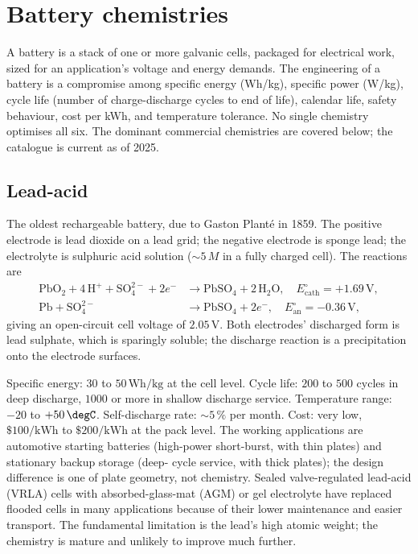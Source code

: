 \section{Battery chemistries}

A battery is a stack of one or more galvanic cells, packaged for
electrical work, sized for an application's voltage and energy
demands. The engineering of a battery is a compromise among specific
energy (Wh/kg), specific power (W/kg), cycle life (number of
charge-discharge cycles to end of life), calendar life, safety
behaviour, cost per kWh, and temperature tolerance. No single
chemistry optimises all six. The dominant commercial chemistries are
covered below; the catalogue is current as of 2025.

\subsection{Lead-acid}

The oldest rechargeable battery, due to Gaston Plant\'e in 1859. The
positive electrode is lead dioxide on a lead grid; the negative
electrode is sponge lead; the electrolyte is sulphuric acid solution
($\sim 5\,M$ in a fully charged cell). The reactions are
\begin{align*}
\text{PbO}_2 + 4\,\text{H}^+ + \text{SO}_4^{2-} + 2 e^- &\to \text{PbSO}_4
+ 2\,\text{H}_2\text{O}, \quad E^\circ_{\text{cath}} = +1.69\,\text{V}, \\
\text{Pb} + \text{SO}_4^{2-} &\to \text{PbSO}_4 + 2 e^-, \quad
E^\circ_{\text{an}} = -0.36\,\text{V},
\end{align*}
giving an open-circuit cell voltage of $2.05\,\text{V}$. Both
electrodes' discharged form is lead sulphate, which is sparingly
soluble; the discharge reaction is a precipitation onto the electrode
surfaces.

Specific energy: $30$ to $50\,\text{Wh}/\text{kg}$ at the cell level.
Cycle life: $200$ to $500$ cycles in deep discharge, $1000$ or more
in shallow discharge service. Temperature range: $-20$ to $+50\,
\degC$. Self-discharge rate: $\sim 5\,\%$ per month. Cost: very low,
$\$100/\text{kWh}$ to $\$200/\text{kWh}$ at the pack level. The
working applications are automotive starting batteries (high-power
short-burst, with thin plates) and stationary backup storage (deep-
cycle service, with thick plates); the design difference is one of
plate geometry, not chemistry. Sealed valve-regulated lead-acid (VRLA)
cells with absorbed-glass-mat (AGM) or gel electrolyte have replaced
flooded cells in many applications because of their lower maintenance
and easier transport. The fundamental limitation is the lead's high
atomic weight; the chemistry is mature and unlikely to improve much
further.

